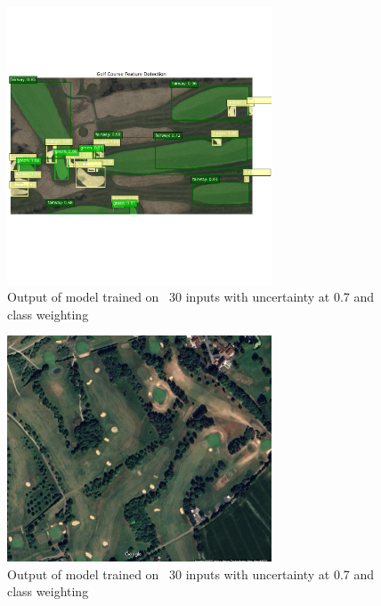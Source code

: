 \documentclass[final]{cmpreport_02}
\begin{document}
\begin{figure}[h!]
	\centering
	\includegraphics[width=0.7\textwidth]{./images/AENoRoughDemoTraining.png}
	\caption{Output of model trained on ~30 inputs with uncertainty at 0.7 and class weighting}
	\label{am:AENoRoughDemoTraining}
\end{figure}


\begin{figure}[h!]
	\centering
	\includegraphics[width=0.7\textwidth]{./images/AEEnglishCoursePlain.png}
	\caption{Output of model trained on ~30 inputs with uncertainty at 0.7 and class weighting}
	\label{am:AEEnglishCoursePlain}
\end{figure}
\end{document}

